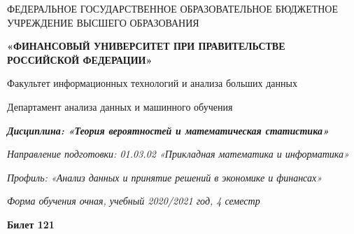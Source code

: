 \documentclass[a4paper,14pt]{article}
\begin{document}
\begin{center}
ФЕДЕРАЛЬНОЕ ГОСУДАРСТВЕННОЕ ОБРАЗОВАТЕЛЬНОЕ БЮДЖЕТНОЕ УЧРЕЖДЕНИЕ ВЫСШЕГО ОБРАЗОВАНИЯ

    \textbf{«ФИНАНСОВЫЙ УНИВЕРСИТЕТ ПРИ ПРАВИТЕЛЬСТВЕ РОССИЙСКОЙ ФЕДЕРАЦИИ»}

Факультет информационных технологий и анализа больших данных

Департамент анализа данных и машинного обучения

\textit{
	\textbf{Дисциплина: «Теория вероятностей и математическая статистика»}}

\textit{Направление подготовки: 01.03.02 «Прикладная математика и информатика»}

\textit{Профиль: «Анализ данных и принятие решений в экономике и финансах»}

\textit{Форма обучения очная, учебный 2020/2021 год, 4 семестр}

\textbf{Билет 121}

\end{center}
\end{document}
